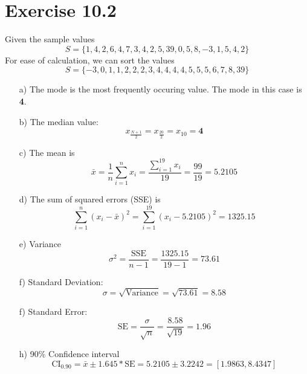\documentclass[a4paper]{article}
\begin{document}
\section*{Exercise 10.2}
Given the sample values
\begin{equation*}
S=\{1,4,2,6,4,7,3,4,2,5,39,0,5,8,-3,1,5,4,2\}
\end{equation*}
For ease of calculation, we can sort the values
\begin{equation*}
S=\{-3,0,1,1,2,2,2,3,4,4,4,4,5,5,5,6,7,8,39\}
\end{equation*}
\begin{enumerate}
	\item[a)] The mode is the most frequently occuring value. The mode in this case is \textbf{4}.
	\item[b)] The median value: 
	\begin{equation*}
	x_{\frac{N+1}{2}}=x_{\frac{20}{2}}=x_{10}=\mathbf{4}
	\end{equation*}
	\item[c)] The mean is
	\begin{equation*}
	\bar{x}=\frac{1}{n}\sum_{i=1}^{n}x_i=\frac{\sum_{i=1}^{19}x_i}{19}=\frac{99}{19}=\mathbf{5.2105}
	\end{equation*}
	\item[d)] The sum of squared errors (SSE) is
	\begin{equation*}
	\sum_{i=1}^{n}(x_i-\bar{x})^2 = \sum_{i=1}^{19}(x_i-5.2105)^2 = \mathbf{1325.15}
	\end{equation*}
	\item[e)] Variance 
	\begin{equation*}
	\sigma^2=\frac{\text{SSE}}{n-1} = \frac{1325.15}{19-1} = \mathbf{73.61}
	\end{equation*}
	\item[f)] Standard Deviation:
	\begin{equation*}
	\sigma=\sqrt{\text{Variance}} = \sqrt{73.61} = \mathbf{8.58}
	\end{equation*}
	\item[f)] Standard Error:
	\begin{equation*}
	\text{SE}=\frac{\sigma}{\sqrt{n}} = \frac{8.58}{\sqrt{19}} = \mathbf{1.96}
	\end{equation*}
	\item[h)] 90\% Confidence interval
	\begin{equation*}
	\text{CI}_{0.90} = \bar{x} \pm 1.645*\text{SE} = 5.2105 \pm 3.2242 = \mathbf{[1.9863,8.4347]}
	\end{equation*}
\end{enumerate}
\end{document}
